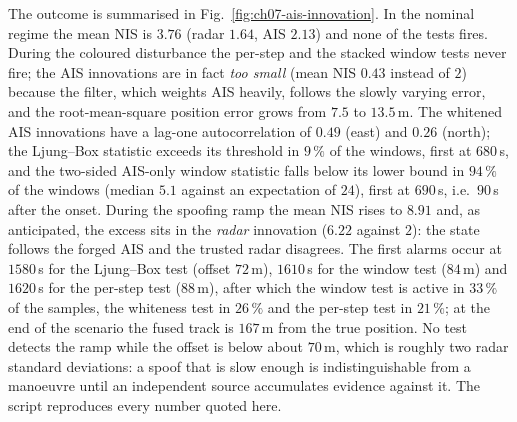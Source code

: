 \begin{example}
The outcome is summarised in Fig.~\ref{fig:ch07-ais-innovation}. In the nominal regime the mean NIS is $3.76$ (radar $1.64$, AIS $2.13$) and none of the tests fires. During the coloured disturbance the per-step and the stacked window tests never fire; the AIS innovations are in fact \emph{too small} (mean NIS $0.43$ instead of $2$) because the filter, which weights AIS heavily, follows the slowly varying error, and the root-mean-square position error grows from $7.5$ to $13.5$\,m. The whitened AIS innovations have a lag-one autocorrelation of $0.49$ (east) and $0.26$ (north); the Ljung--Box statistic exceeds its threshold in $9\,\%$ of the windows, first at $680$\,s, and the two-sided AIS-only window statistic falls below its lower bound in $94\,\%$ of the windows (median $5.1$ against an expectation of $24$), first at $690$\,s, i.e.\ $90$\,s after the onset. During the spoofing ramp the mean NIS rises to $8.91$ and, as anticipated, the excess sits in the \emph{radar} innovation ($6.22$ against $2$): the state follows the forged AIS and the trusted radar disagrees. The first alarms occur at $1580$\,s for the Ljung--Box test (offset $72$\,m), $1610$\,s for the window test ($84$\,m) and $1620$\,s for the per-step test ($88$\,m), after which the window test is active in $33\,\%$ of the samples, the whiteness test in $26\,\%$ and the per-step test in $21\,\%$; at the end of the scenario the fused track is $167$\,m from the true position. No test detects the ramp while the offset is below about $70$\,m, which is roughly two radar standard deviations: a spoof that is slow enough is indistinguishable from a manoeuvre until an independent source accumulates evidence against it. The script  reproduces every number quoted here.
\end{example}


